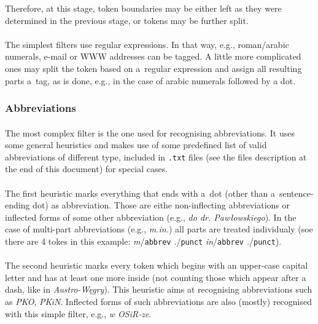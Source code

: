 \documentclass[oneside,12pt]{article}
\begin{document}
Therefore, at this stage, token boundaries may be either left as they were determined in the previous stage, or tokens may be further split.
    
\paragraph{}
The simplest filters use regular expressions. In that way, e.g., roman/arabic numerals, e-mail or WWW addresses can be tagged. A little more complicated ones may split the token based on a~regular expression and assign all resulting parts a~tag, as is done, e.g., in the case of arabic numerals followed by a dot.

\subsubsection{Abbreviations}

\paragraph{}
The most complex filter is the one used for recognising abbreviations. It uses some general heuristics and makes use of some predefined list of valid abbreviations of different type, included in \texttt{.txt} files (see the files description at the end of this document) for special cases.

\paragraph{}
The first heuristic marks everything that ends with a~dot (other than a~sentence-ending dot) as abbreviation. Those are eithe non-inflecting abbreviations or inflected forms of some other abbreviation (e.g., \textit{do dr. Pawłowskiego}). In the case of multi-part abbreviations (e.g., \textit{m.in.}) all parts are treated individualy (soe there are 4 tokes in this example: \textit{m}/\texttt{abbrev} \textit{.}/\texttt{punct} \textit{in}/\texttt{abbrev} \textit{.}/\texttt{punct}).

\paragraph{}
The second heuristic marks every token which begins with an upper-case capital letter and has at least one more inside (not counting those which appear after a dash, like in \textit{Austro-Węgry}). This heuristic aims at recognising abbreviations such as \textit{PKO}, \textit{PKiN}. Inflected forms of such abbreviations are also (mostly) recognised with this simple filter, e.g., \textit{w OSiR-ze}.
\end{document}
